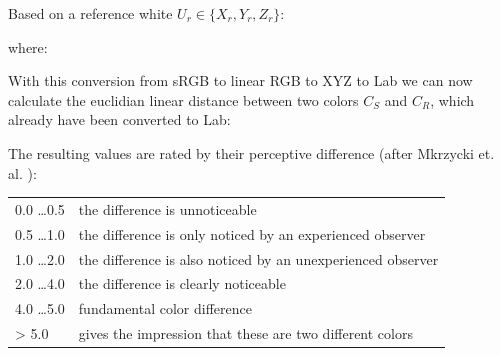 Based on a reference white $U_r \in \{X_r, Y_r, Z_r\}$:



where:





With this conversion from sRGB to linear RGB to XYZ to Lab we can now calculate 
the euclidian linear distance between two colors $C_S$ and $C_R$, which already 
have been converted to Lab:


The resulting values are rated by their perceptive difference (after Mkrzycki 
et. al. \cite{mokrzycki:2012}):

\begin{tabular}[htb]{l | l}
	0.0 \dots 0.5 & the difference is unnoticeable \\
	0.5 \dots 1.0 & the difference is only noticed by an experienced observer \\
	1.0 \dots 2.0 & the difference is also noticed by an unexperienced observer 
	\\
	2.0 \dots 4.0 & the difference is clearly noticeable \\
	4.0 \dots 5.0 & fundamental color difference  \\
	> 5.0 		  & gives the impression that these are two different 
	colors
\end{tabular}


